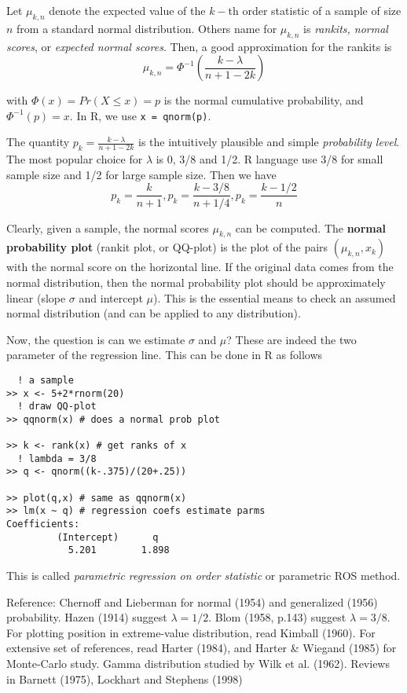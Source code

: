 Let $\mu_{k,n}$ denote the expected value of the $k-$th order
statistic of a sample of size $n$ from a standard normal
distribution. Others name for $\mu_{k,n}$ is
{\it rankits, normal scores}, or {\it expected normal scores}. Then, a
good approximation for the rankits is
\begin{equation}
  \label{eq:13}
  \mu_{k,n} = \Phi^{-1} (\frac{k-\lambda}{n+1-2k})
\end{equation}

with $\Phi(x)=Pr(X\le x)=p$ is the normal cumulative probability, and
$\Phi^{-1}(p) = x$. In R, we use \lstinline!x = qnorm(p)!. 

The quantity $p_k = \frac{k-\lambda}{n+1-2k}$ is the intuitively
plausible and simple {\it probability level}. The most popular choice
for $\lambda$ is 0, 3/8 and 1/2. R language use 3/8 for small sample
size and 1/2 for large sample size. Then we have
\begin{equation}
  \label{eq:22}
  p_k = \frac{k}{n+1}, p_k = \frac{k-3/8}{n+1/4}, p_k = \frac{k-1/2}{n}
\end{equation}



Clearly, given a sample, the normal scores $\mu_{k,n}$ can be
computed. The {\bf normal probability plot} (rankit plot, or QQ-plot)
is the plot of the pairs $(\mu_{k,n},x_{k})$ with the normal score on
the horizontal line. If the original data comes from the normal
distribution, then the normal probability plot should be approximately
linear (slope $\sigma$ and intercept $\mu$). This is the essential
means to check an assumed normal distribution (and can be applied to
any distribution).


Now, the question is can we estimate $\sigma$ and $\mu$? These are
indeed the two parameter of the regression line. This can be done in R
as follows
\begin{lstlisting}
  ! a sample
>> x <- 5+2*rnorm(20)
  ! draw QQ-plot
>> qqnorm(x) # does a normal prob plot

>> k <- rank(x) # get ranks of x
  ! lambda = 3/8
>> q <- qnorm((k-.375)/(20+.25))

>> plot(q,x) # same as qqnorm(x)
>> lm(x ~ q) # regression coefs estimate parms
Coefficients:
         (Intercept)      q
           5.201        1.898
\end{lstlisting}
This is called {\it parametric regression on order statistic} or
parametric ROS method.


Reference: Chernoff and Lieberman for normal (1954) and generalized
(1956) probability. Hazen (1914) suggest $\lambda=1/2$. Blom (1958,
p.143) suggest $\lambda=3/8$. For plotting position in extreme-value
distribution, read Kimball (1960). For extensive set of references,
read Harter (1984), and Harter \& Wiegand (1985) for Monte-Carlo
study. Gamma distribution studied by Wilk et al. (1962). Reviews in
Barnett (1975), Lockhart and Stephens (1998)





